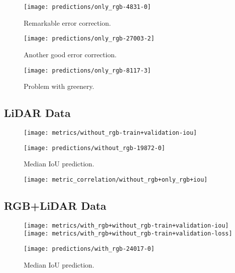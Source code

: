 \begin{figure}[H]
  \centering
  \texttt{[image: predictions/only\_rgb-4831-0]}  %
  \caption{%
    Remarkable error correction.
  }
\end{figure}

\begin{figure}[H]
  \centering
  \texttt{[image: predictions/only\_rgb-27003-2]}  %
  \caption{%
    Another good error correction.
  }
\end{figure}

\begin{figure}[H]
  \centering
  \texttt{[image: predictions/only\_rgb-8117-3]}  %
  \caption{%
    Problem with greenery.
  }
\end{figure}

\subsection{LiDAR Data}

\begin{figure}[H]
  \centering
  \texttt{[image: metrics/without\_rgb-train+validation-iou]}
\end{figure}

\begin{figure}[H]
  \centering
  \texttt{[image: predictions/without\_rgb-19872-0]}  %
  \caption{%
    Median IoU prediction.
  }
\end{figure}

\begin{figure}[H]
  \centering
  \texttt{[image: metric\_correlation/without\_rgb+only\_rgb+iou]}
\end{figure}

\subsection{RGB+LiDAR Data}

\begin{figure}[H]
  \centering
  \texttt{[image: metrics/with\_rgb+without\_rgb-train+validation-iou]}
  \texttt{[image: metrics/with\_rgb+without\_rgb-train+validation-loss]}
\end{figure}

\begin{figure}[H]
  \centering
  \texttt{[image: predictions/with\_rgb-24017-0]}  %
  \caption{%
    Median IoU prediction.
  }
\end{figure}

